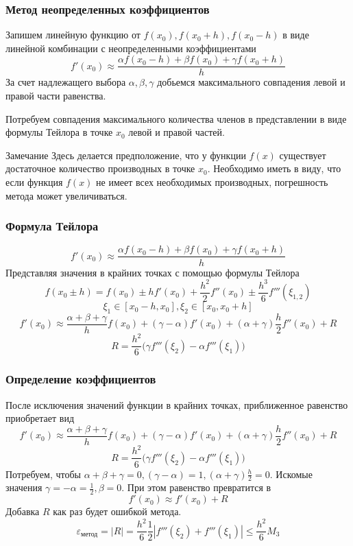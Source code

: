 \documentclass[aspectratio=43,unicode]{beamer}
\begin{document}
\begin{frame}
\frametitle{Метод неопределенных коэффициентов}
	Запишем линейную функцию от $f(x_0), f(x_0+h), f(x_0-h)$ в виде линейной комбинации с неопределенными коэффициентами
	\[
	f'(x_0) \approx \frac{\alpha f(x_0-h)  + \beta f(x_0) + \gamma f(x_0+h)}{h}
	\]
	За счет надлежащего выбора $\alpha, \beta, \gamma$ добьемся максимального совпадения левой и правой части равенства.

	\pause
	Потребуем совпадения максимального количества членов в представлении в виде формулы Тейлора в точке $x_0$ левой и правой частей.
	\begin{block}{Замечание}
	Здесь делается предположение, что у функции $f(x)$ существует достаточное количество производных в точке $x_0$.
	Необходимо иметь в виду, что если функция $f(x)$ не имеет всех необходимых производных, погрешность метода может увеличиваться.
	\end{block}
\end{frame}

\begin{frame}
\frametitle{Формула Тейлора}
	\[
	f'(x_0) \approx \frac{\alpha f(x_0-h)  + \beta f(x_0) + \gamma f(x_0+h)}{h}
	\]
	Представляя значения в крайних точках с помощью формулы Тейлора
	\[
	f(x_0 \pm h) = f(x_0) \pm h f'(x_0) + \frac{h^2}{2} f''(x_0) \pm \frac{h^3}{6} f'''(\xi_{1,2})
	\]
	\[
	\xi_1 \in [x_0-h, x_0],\xi_2 \in [x_0, x_0+h]
	\]
	\[
	f'(x_0) \approx \frac{\alpha + \beta + \gamma}{h} f(x_0) + (\gamma - \alpha) f'(x_0) + (\alpha+\gamma) \frac{h}{2}f''(x_0) + R
	\]
	\[
	R = \frac{h^2}{6}\Big(\gamma f'''(\xi_2) - \alpha f'''(\xi_1)\Big)
	\]
\end{frame}

\begin{frame}
\frametitle{Определение коэффициентов}
	После исключения значений функции в крайних точках, приближенное равенство приобретает вид
	\[
	f'(x_0) \approx \frac{\alpha + \beta + \gamma}{h} f(x_0) + (\gamma - \alpha) f'(x_0) + (\alpha+\gamma) \frac{h}{2}f''(x_0) + R
	\]
	\[
	R = \frac{h^2}{6}\Big(\gamma f'''(\xi_2) - \alpha f'''(\xi_1)\Big)
	\]
	Потребуем, чтобы $\alpha + \beta + \gamma = 0, (\gamma - \alpha) = 1, (\alpha+\gamma) \frac{h}{2} = 0$.
	Искомые значения $\gamma = -\alpha = \frac{1}{2}, \beta = 0$.
	При этом равенство превратится в
	\[
	f'(x_0) \approx f'(x_0) + R
	\]
	Добавка $R$ как раз будет ошибкой метода.
	\[
	\varepsilon_{\text{метод}} = |R| = \frac{h^2}{6} \frac{1}{2}|f'''(\xi_2) + f'''(\xi_1)| \leqslant \frac{h^2}{6} M_3
	\]
\end{frame}
\end{document}
